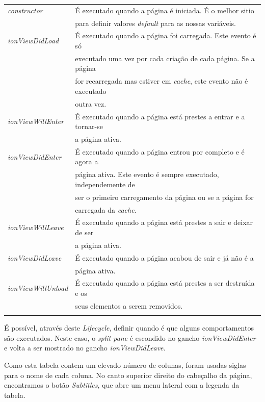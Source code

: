 \begin{tabular}{ll}
	\textit{constructor} & É executado quando a página é iniciada. É o melhor sitio \\
	&para definir valores \textit{default} para as nossas variáveis.\\
	\textit{ionViewDidLoad} & É executado quando a página foi carregada. Este evento é só \\
	&executado uma vez por cada criação de cada página. Se a página \\
	&for recarregada mas estiver em \textit{cache}, este evento não é executado\\
	& outra vez.\\
	\textit{ionViewWillEnter} & É executado quando a página está prestes a entrar e a tornar-se \\
	&a página ativa.\\
	\textit{ionViewDidEnter} & É executado quando a página entrou por completo e é agora a \\
	&página ativa. Este evento é sempre executado, independemente de \\
	&ser o primeiro carregamento da página ou se a página for \\
	&carregada da \textit{cache}.\\
	\textit{ionViewWillLeave} & É executado quando a página está prestes a sair e deixar de ser \\
	&a página ativa.\\
	\textit{ionViewDidLeave} & É executado quando a página acabou de sair e já não é a \\
	&página ativa.\\
	\textit{ionViewWillUnload} & É executado quando a página está prestes a ser destruída e os \\
	&seus elementos a serem removidos.\\
	\\
\end{tabular}

É possível, através deste \textit{Lifecycle}, definir quando é que alguns comportamentos são executados. Neste caso, o \textit{split-pane} é escondido no gancho \textit{ionViewDidEnter}
e volta a ser mostrado no gancho \textit{ionViewDidLeave}.

Como esta tabela contem um elevado número de colunas, foram usadas siglas para o nome de cada coluna. No canto superior direito do cabeçalho da página, encontramos o botão \textit{Subtitles}, que abre um menu lateral com a legenda da tabela. 
\newpage

